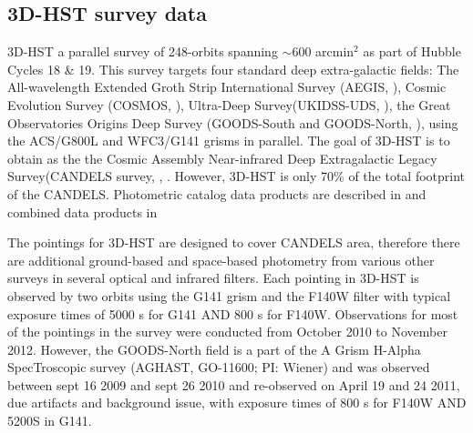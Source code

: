 \documentclass[manuscript]{aastex63}
\begin{document}
\subsection{3D-HST survey data}
 3D-HST a parallel survey of 248-orbits spanning $\sim$600 arcmin$^2$ as part of Hubble Cycles 18 \& 19. This survey targets four standard deep extra-galactic fields: The All-wavelength Extended Groth Strip International Survey (AEGIS, \citealt{1538-4357-660-1-L1} ), Cosmic Evolution Survey (COSMOS, \citealt{Scoville2007}), Ultra-Deep Survey(UKIDSS-UDS, \citealt{2007MNRAS.379.1599L}), the Great Observatories Origins Deep Survey (GOODS-South and GOODS-North, \citealt{Giavalisco2004}), using the ACS/G800L and WFC3/G141 grisms in parallel. The goal of 3D-HST is to obtain as the the Cosmic Assembly Near-infrared Deep Extragalactic Legacy Survey(CANDELS survey, \citealt{2011ApJS..197...35G}, \citealt{2011ApJS..197...36K}. However, 3D-HST is only 70\% of the total footprint of the CANDELS. Photometric catalog data products are described in \cite{Skelton2014} and combined data products in \cite{Momcheva2016}

 The pointings for 3D-HST are designed to cover CANDELS area, therefore there are additional ground-based and space-based photometry from various other surveys in several optical and infrared filters. Each pointing in 3D-HST is observed by two orbits using the G141 grism and the F140W filter with typical exposure times of 5000 s for G141 AND 800 s for F140W. Observations for most of the pointings in the survey were conducted from October 2010 to November 2012. However, the GOODS-North field is a part of the A Grism H-Alpha SpecTroscopic survey (AGHAST, GO-11600; PI: Wiener) and was observed between sept 16 2009 and sept 26 2010 and re-observed on April 19 and 24 2011, due artifacts and background issue, with exposure times of 800 s for F140W AND 5200S in G141.  
\end{document}
